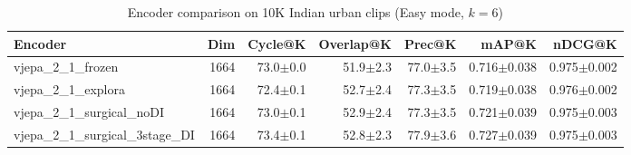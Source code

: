 \begin{table}[ht]
\centering
\caption{Encoder comparison on 10K Indian urban clips (Easy mode, $k=6$)}
\label{tab:encoder_comparison}
\begin{tabular}{lrrrrrr}
\toprule
Encoder & Dim & Cycle@K & Overlap@K & Prec@K & mAP@K & nDCG@K \\
\midrule
vjepa\_2\_1\_frozen & 1664 & 73.0{\tiny$\pm$0.0} & 51.9{\tiny$\pm$2.3} & 77.0{\tiny$\pm$3.5} & 0.716{\tiny$\pm$0.038} & 0.975{\tiny$\pm$0.002} \\
vjepa\_2\_1\_explora & 1664 & 72.4{\tiny$\pm$0.1} & 52.7{\tiny$\pm$2.4} & 77.3{\tiny$\pm$3.5} & 0.719{\tiny$\pm$0.038} & 0.976{\tiny$\pm$0.002} \\
vjepa\_2\_1\_surgical\_noDI & 1664 & 73.0{\tiny$\pm$0.1} & 52.9{\tiny$\pm$2.4} & 77.3{\tiny$\pm$3.5} & 0.721{\tiny$\pm$0.039} & 0.975{\tiny$\pm$0.003} \\
vjepa\_2\_1\_surgical\_3stage\_DI & 1664 & 73.4{\tiny$\pm$0.1} & 52.8{\tiny$\pm$2.3} & 77.9{\tiny$\pm$3.6} & 0.727{\tiny$\pm$0.039} & 0.975{\tiny$\pm$0.003} \\
\bottomrule
\end{tabular}
\end{table}